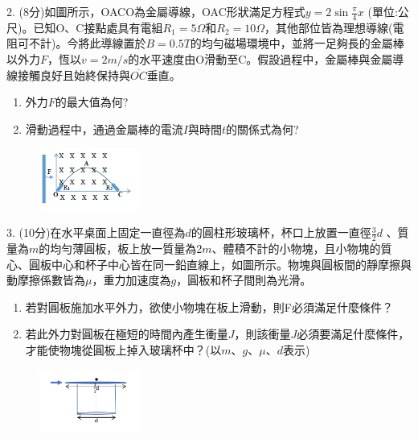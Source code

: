 \documentclass[cn,10pt,math=newtx,chinesefont=founder,device=ig]{elegantbook}
\begin{document}
\begin{example}
   2. (8分)如圖所示，OACO為金屬導線，OAC形狀滿足方程式$y = 2\sin{\frac{\pi}{4} x}$
(單位:公尺)。已知O、C接點處具有電組$R_1=5 \Omega$和$R_2=10 \Omega$，其他部位皆為理想導線(電阻可不計)。今將此導線置於$B=0.5T$的均勻磁場環境中，並將一足夠長的金屬棒以外力$F$，恆以$v=2 m/s$的水平速度由O滑動至C。假設過程中，金屬棒與金屬導線接觸良好且始終保持與$\overline{OC}$垂直。 \begin{enumerate}[label=(\arabic*)] 
  \item 外力$F$的最大值為何?
  \item 滑動過程中，通過金屬棒的電流$I$與時間$t$的關係式為何?
    \end{enumerate}
    \rightline{[中壢高中教甄109]}
\end{example}
\begin{solution}
    
\end{solution}
\begin{figure}[htbp]
    \flushright
    \includegraphics[width=0.3\textwidth]{image/109中壢222.png}
  \end{figure}
\newpage


\begin{example}
   3. (10分)在水平桌面上固定一直徑為$d$的圓柱形玻璃杯，杯口上放置一直徑$\frac{3}{2} d$
、質量為$m$的均勻薄圓板，板上放一質量為2$m$、體積不計的小物塊，且小物塊的質心、圓板中心和杯子中心皆在同一鉛直線上，如圖所示。物塊與圓板間的靜摩擦與動摩擦係數皆為$\mu$，重力加速度為$g$，圓板和杯子間則為光滑。

\begin{enumerate}[label=(\arabic*)] 
  \item 若對圓板施加水平外力，欲使小物塊在板上滑動，則F必須滿足什麼條件？
  \item 若此外力對圓板在極短的時間內產生衝量$J$，則該衝量$J$必須要滿足什麼條件，才能使物塊從圓板上掉入玻璃杯中？(以$m、g、\mu、d$表示)
    \end{enumerate}
    \rightline{[中壢高中教甄109]}
\end{example}
\begin{solution}
    
\end{solution}
\begin{figure}[htbp]
    \flushright
    \includegraphics[width=0.3\textwidth]{image/109中壢223.png}
  \end{figure}
\newpage
\end{document}
